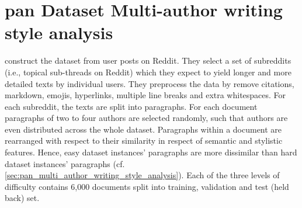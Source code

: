 \section{\acs{pan} Dataset Multi-author writing style analysis}
\label{sec:pan_dataset_multi_author_writing_style_analysis}

\citet{zangerle_overview_2024} construct the dataset from user posts on Reddit.
They select a set of subreddits (i.e., topical sub-threads on Reddit) 
which they expect to yield longer and more detailed texts by individual users.
They preprocess the data by remove citations, markdown, emojis, hyperlinks, 
multiple line breaks and extra whitespaces.
For each subreddit, the texts are split into paragraphs.
For each document paragraphs of two to four authors are selected randomly, 
such that authors are even distributed across the whole dataset.
Paragraphs within a document are rearranged with respect to their similarity 
in respect of semantic and stylistic features.
Hence, easy dataset instances' paragraphs are more dissimilar 
than hard dataset instances' paragraphs (cf. \autoref{sec:pan_multi_author_writing_style_analysis}).
Each of the three levels of difficulty contains 6,000 documents 
split into training, validation and test (held back) set.